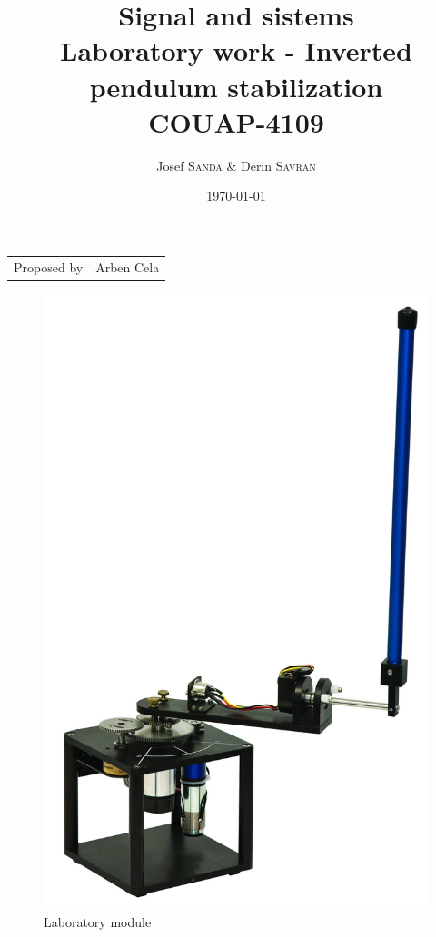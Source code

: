 \documentclass{article}
\title{Signal and sistems \\ Laboratory work - Inverted pendulum stabilization \\ COUAP-4109} %
\author{Josef \textsc{Sanda} \& Derin \textsc{Savran}} %
\date{\today} %
\begin{document}
\maketitle %

\begin{center}
\begin{tabular}{l r}
Proposed by & Arben Cela %
\end{tabular}
\end{center}
\begin{figure}[ht!]
    \centering
    \includegraphics[scale=0.13]{img/rotary_inverted_pendulum.jpg}
    \caption{Laboratory module \label{fig:laboratory_module}}
\end{figure}
\end{document}
